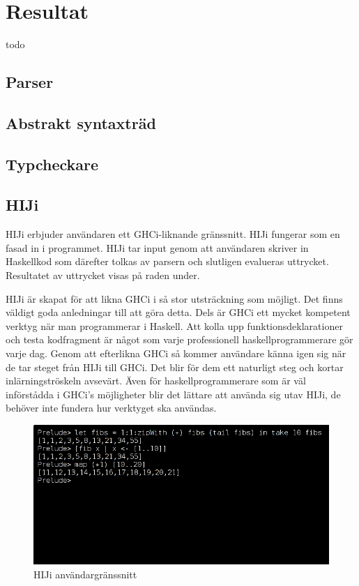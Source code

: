 \section{Resultat}
todo

\subsection{Parser} 

\subsection{Abstrakt syntaxträd} 

\subsection{Typcheckare} 


\subsection{HIJi}


HIJi erbjuder användaren ett GHCi-liknande gränssnitt. HIJi fungerar som en fasad in i programmet. 
HIJi tar input genom att användaren skriver in Haskellkod som därefter tolkas av parsern och slutligen evalueras uttrycket. Resultatet av uttrycket visas på raden under.

HIJi är skapat för att likna GHCi i så stor utsträckning som möjligt. Det finns väldigt goda anledningar till att göra detta. Dels är GHCi ett mycket kompetent verktyg när man programmerar i Haskell. Att kolla upp funktionsdeklarationer och testa kodfragment är något som varje professionell haskellprogrammerare gör varje dag. Genom att efterlikna GHCi så kommer användare känna igen sig när de tar steget från HIJi till GHCi. Det blir för dem ett naturligt steg och kortar inlärningströskeln avsevärt. Även för haskellprogrammerare som är väl införstådda i GHCi's möjligheter blir det lättare att använda sig utav HIJi, de behöver inte fundera hur verktyget ska användas.

\begin{figure}
    \begin{center}
        \includegraphics[width=1\textwidth]{hiji_screen3.png}
        \caption{HIJi användargränssnitt}
    \end{center}
\end{figure}

